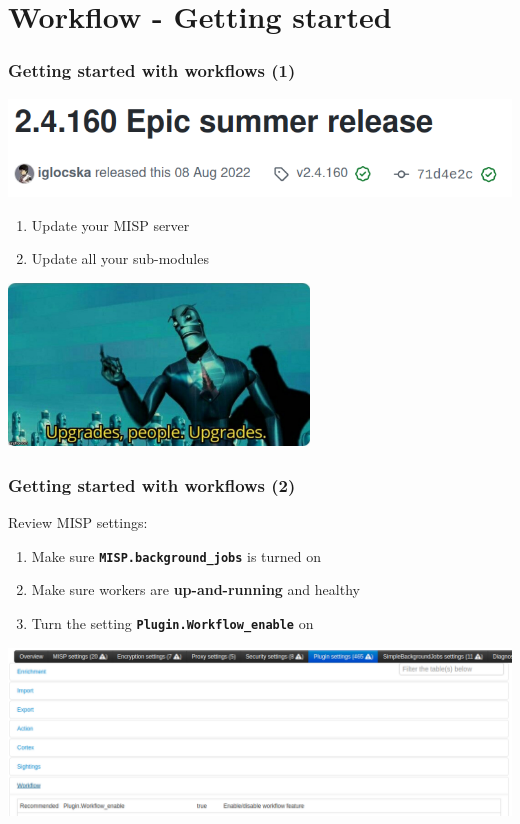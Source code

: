 \section{Workflow - Getting started}
\begin{frame}
    \frametitle{Getting started with workflows (1)}
    \begin{center}
        \includegraphics[width=0.9\linewidth]{pictures/workflow-release.png}
    \end{center}
    \begin{enumerate}
        \item Update your MISP server
        \item Update all your sub-modules
    \end{enumerate}
    \begin{center}
        \includegraphics[width=0.6\textwidth]{pictures/upgrade-people.jpeg}
    \end{center}
\end{frame}

\begin{frame}
    \frametitle{Getting started with workflows (2)}
    Review MISP settings:
    \begin{enumerate}
        \item Make sure \texttt{\bf MISP.background\_jobs} is turned on
        \item Make sure workers are \textbf{up-and-running} and healthy
        \item Turn the setting \texttt{\bf Plugin.Workflow\_enable} on
    \end{enumerate}
    \begin{center}
        \includegraphics[width=1.0\textwidth]{pictures/settings-2.png}
    \end{center}
\end{frame}

